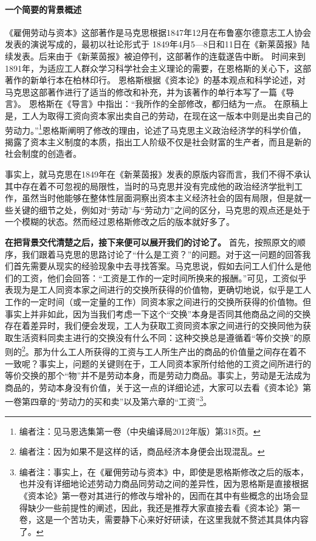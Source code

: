 \documentclass[a4paper,twoside,12pt,AutoFakeBold]{ctexart}
\begin{document}
\paragraph{一个简要的背景概述}\begin{fangsong}
《雇佣劳动与资本》这部著作是马克思根据1847年12月在布鲁塞尔德意志工人协会发表的演说写成的，最初以社论形式于 1849年4月5—8日和11日在《新莱茵报》陆续发表。后来由于《新莱茵报》被迫停刊，这部著作的连载遂告中断。 
时间来到1891年，为适应工人群众学习科学社会主义理论的需要，在恩格斯的关心下，这部著作的新单行本在柏林印行。 恩格斯根据《资本论》的基本观点和科学论述，对马克思这部著作进行了适当的修改和补充，并为该著作的单行本写了一篇《导言》。 恩格斯在《导言》中指出：“我所作的全部修改，都归结为一点。 在原稿上是，工人为取得工资向资本家出卖自己的劳动，在现在这一版本中则是出卖自己的劳动力。”\footnote{编者注：见马恩选集第一卷（中央编译局2012年版）第318页。}恩格斯阐明了修改的理由，论述了马克思主义政治经济学的科学价值，揭露了资本主义制度的本质，指出工人阶级不仅是社会财富的生产者，而且是新的社会制度的创造者。
\end{fangsong}

事实上，就马克思在1849年在《新莱茵报》发表的原版内容而言，我们不得不承认其中存在着不可忽视的局限性，当时的马克思并没有完成他的政治经济学批判工作，虽然当时他能够在整体性层面洞察出资本主义经济社会的固有局限，但是就一些关键的细节之处，例如对“劳动”与“劳动力”之间的区分，马克思的观点还是处于一个模糊的状态。然而经过恩格斯修改之后的版本就好多了。

 \vspace{0.5cm} %
\textbf{在把背景交代清楚之后，接下来便可以展开我们的讨论了。}
首先，按照原文的顺序，我们跟着马克思的思路讨论了“什么是工资？”的问题。对于这一问题的回答我们首先需要从现实的经验现象中去寻找答案。马克思说，假如去问工人们什么是他们的工资，他们会回答：“工资是工作的一定时间所换来的报酬。”可见，工资似乎表现为是工人同资本家之间进行的交换所获得的价值物，更确切地说，似乎是工人工作的一定时间（或一定量的工作）同资本家之间进行的交换所获得的价值物。但事实上并非如此，因为当我们考虑一下这个“交换”本身是否同其他商品之间的交换存在着差异时，我们便会发现，工人为获取工资同资本家之间进行的交换同他为获取生活资料同卖主进行的交换没有什么不同：这种交换总是遵循着“等价交换”的原则的\footnote{编者注：因为如果不是这样的话，商品经济本身便会出现混乱。}。那为什么工人所获得的工资与工人所生产出的商品的价值量之间存在着不一致呢？事实上，问题的关键则在于，工人同资本家所付给他的工资之间所进行的等价交换的那个“物”并不是劳动本身，而是劳动力商品。事实上，劳动是无法成为商品的，劳动本身没有价值，关于这一点的详细论述，大家可以去看《资本论》第一卷第四章的“劳动力的买和卖”以及第六章的“工资”\footnote{编者注：事实上，在《雇佣劳动与资本》中，即使是恩格斯修改之后的版本，也并没有详细地论述劳动力商品同劳动之间的差异性，因为恩格斯是直接根据《资本论》第一卷对其进行的修改与增补的，因而在其中有些概念的出场会显得缺少一些前提性的阐述，因此，我还是推荐大家直接去看《资本论》第一卷，这是一个苦功夫，需要静下心来好好研读，在这里我就不赘述其具体内容了。}。
\end{document}
